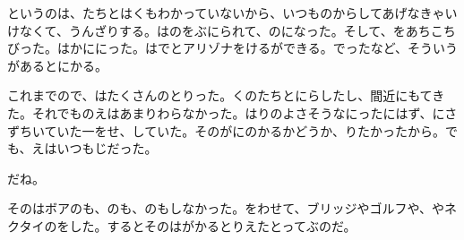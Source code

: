 というのは、たちとはくもわかっていないから、いつものからしてあげなきゃいけなくて、うんざりする。はのをぶにられて、のになった。そして、をあちこちびった。はかににった。はでとアリゾナをけるができる。でったなど、そういうがあるとにかる。

これまでので、はたくさんのとりった。くのたちとにらしたし、間近にもてきた。それでものえはあまりわらなかった。はりのよさそうなにったにはず、にさずちいていた一をせ、していた。そのがにのかるかどうか、りたかったから。でも、えはいつもじだった。

だね。

そのはボアのも、のも、のもしなかった。をわせて、ブリッジやゴルフや、やネクタイのをした。するとそのはがかるとりえたとってぶのだ。
